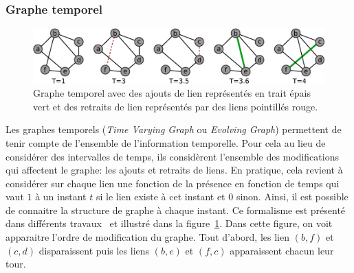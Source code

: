 \subsubsection{Graphe temporel}
\begin{figure}[h]
\centering
\includegraphics[width=0.9\linewidth]{img/Intro/evolvingGraph.eps}
\caption{Graphe temporel avec des ajouts de lien représentés en trait épais vert et des retraits de lien représentés par des liens pointillés rouge.
}
\label{fig:exemple_evolving}
\end{figure}
Les graphes temporels (\emph{Time Varying Graph} ou \emph{Evolving Graph})
permettent de tenir compte de l'ensemble de l'information temporelle.
Pour cela au lieu de considérer des intervalles de temps, ils considèrent l'ensemble des modifications qui affectent le graphe: les ajouts et retraits de liens.
En pratique, cela revient à considérer sur chaque lien une fonction de la présence en fonction de temps qui vaut $1$ à un instant $t$ si le lien existe à cet instant et $0$ sinon.
Ainsi, il est possible de connaitre la structure de graphe à chaque instant.
Ce formalisme est présenté dans différents travaux~\cite{Casteigts2011,Wehmuth2014} et illustré dans la figure~\ref{fig:exemple_evolving}.
Dans cette figure, on voit apparaitre l'ordre de modification du graphe.
Tout d'abord, les lien $(b,f)$ et $(c,d)$ disparaissent puis les liens $(b,e)$ et $(f,c)$ apparaissent chacun leur tour. 

